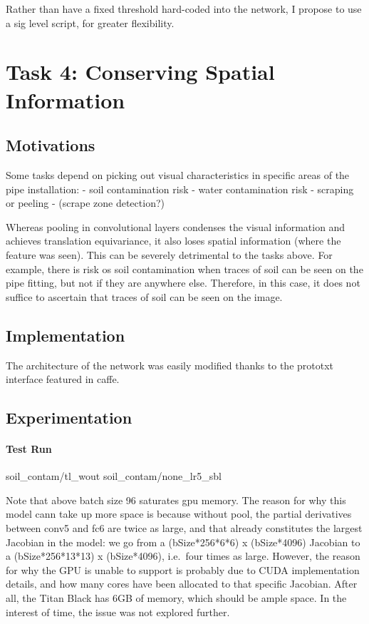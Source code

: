\documentclass[a4paper,11pt]{article}
\begin{document}
Rather than have a fixed threshold hard-coded into the network, I propose to use a sig level script, for greater flexibility. \\


\section{Task 4: Conserving Spatial Information}

\subsection{Motivations}

Some tasks depend on picking out visual characteristics in specific areas of the pipe installation:
- soil contamination risk
- water contamination risk
- scraping or peeling
- (scrape zone detection?)

Whereas pooling in convolutional layers condenses the visual information and achieves translation equivariance, it also loses spatial information (where the feature was seen). This can be severely detrimental to the tasks above. For example, there is risk os soil contamination when traces of soil can be seen on the pipe fitting, but not if they are anywhere else. Therefore, in this case, it does not suffice to ascertain that traces of soil can be seen on the image. \\

\subsection{Implementation}

The architecture of the network was easily modified thanks to the prototxt interface featured in caffe. 

\subsection{Experimentation}

\paragraph{Test Run}
     soil_contam/tl_wout
     soil_contam/none_lr5_sbl

Note that above batch size 96 saturates gpu memory. The reason for why this model cann take up more space is because without pool, the partial derivatives between conv5 and fc6 are twice as large, and that already constitutes the largest Jacobian in the model: we go from a (bSize*256*6*6) x (bSize*4096) Jacobian to a (bSize*256*13*13) x (bSize*4096), i.e.\ four times as large. However, the reason for why the GPU is unable to support is probably due to CUDA implementation details, and how many cores have been allocated to that specific Jacobian. After all, the Titan Black has 6GB of memory, which should be ample space. In the interest of time, the issue was not explored further. \\
     
\end{document}
